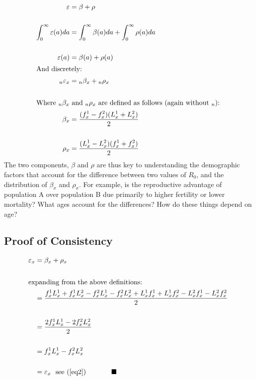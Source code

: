 \documentclass{article}
\begin{document}
\begin{align}
	\varepsilon   &= \beta + \rho \notag\\ \notag \\
	\int_{0}^{\infty}\varepsilon(a)da &= \int_{0}^{\infty}\beta(a)da + \int_{0}^{\infty}\rho(a)da\notag\\ \notag \\
	\varepsilon(a) &= \beta(a)+\rho(a) \notag \\
	\intertext{And discretely:}
	{}_n\varepsilon_{x}   &= {}_n\beta_{x} + {}_n\rho_{x}\label{eq3}\\ \notag \\
	\intertext{Where $_{n}\beta_{x}$ and $_{n}\rho_{x}$ are defined as follows (again without ${}_n$):}
  \beta_{x} 		&= \frac{\displaystyle (f_{x}^{1}-f_{x}^{2})(L_{x}^{1}+L_{x}^{2})}{2} \label{eq4} \\ \notag\\
	\rho_{x} 			&= \frac{\displaystyle (L_{x}^{1}-L_{x}^{2})(f_{x}^{1}+f_{x}^{2})}{2} \label{eq5}
\end{align}
The two components, $\beta$ and $\rho$ are thus key to understanding the demographic factors that account for the difference between two values of $R_{0}$, and the distribution of $\beta_{x}$ and $\rho_{x}$. For example, is the reproductive advantage of population A over population B due primarily to higher fertility or lower mortality? What ages account for the differences? How do these things depend on age? 
\subsection{Proof of Consistency}

\begin{align}
	\varepsilon_{x}	&= \beta_{x}+\rho_{x}\notag \\ \notag \\
	\intertext{expanding from the above definitions:}
					&= \frac{f_{x}^{1}L_{x}^{1}+f_{x}^{1}L_{x}^{2}-f_{x}^{2}L_{x}^{1}-f_{x}^{2}L_{x}^{2}+L_{x}^{1}f_{x}^{1}+L_{x}^{1}f_{x}^{2}-L_{x}^{2}f_{x}^{1}-L_{x}^{2}f_{x}^{2}}{2}\notag \\ \notag \\
								&= \frac{2f_{x}^{1}L_{x}^{1}-2f_{x}^{2}L_{x}^{2}}{2}\notag \\ \notag \\
								&= f_{x}^{1}L_{x}^{1}-f_{x}^{2}L_{x}^{2} \notag \\ \notag \\
								&= \varepsilon_{x} ~~\text{see (\ref{eq2})}{~~~~~~~~~~~}\blacksquare 
\end{align}
\end{document}
